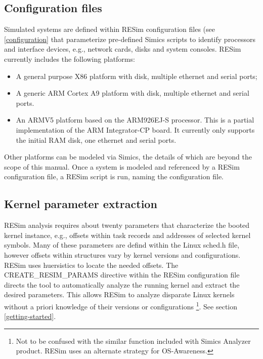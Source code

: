 \documentclass[titlepage]{article}
\begin{document}
\subsection{Configuration files}
Simulated systems are defined within RESim configuration files (see \ref{configuration} that  parameterize pre-defined Simics scripts to identify 
processors and interface devices, e.g., network cards, disks and system consoles.  RESim currently includes the following platforms: 
\begin{itemize}
\item A general purpose X86 platform with disk, multiple ethernet and serial ports;
\item A generic ARM Cortex A9 platform with disk, multiple ethernet and serial ports.
\item An ARMV5 platform based on the ARM926EJ-S processor.  This is a partial implementation of the ARM Integrator-CP board.  It currently only supports
the initial RAM disk, one ethernet and serial ports.
\end{itemize}

Other platforms can be modeled via Simics, the details of which are beyond the scope of this manual.
Once a system is modeled and referenced by a RESim configuration file, a RESim script is run, naming the configuration file.

\subsection{Kernel parameter extraction}
RESim analysis requires about twenty parameters that characterize the booted kernel instance, e.g., offsets within task 
records and addresses of selected kernel symbols. Many of these parameters are defind within the Linux sched.h file, however offsets within structures
vary by kernel versions and configurations.  RESim uses huersistics to locate the needed offsets. 
The CREATE\_RESIM\_PARAMS directive within the RESim configuration file directs the tool to automatically analyze the running kernel 
and extract the desired parameters.  This allows RESim to analyze disparate Linux kernels without a priori 
knowledge of their versions or configurations \footnote{Not to be confused with the similar function included with Simics Analyzer product. RESim uses an alternate strategy for OS-Awareness.}.
See section \ref{getting-started}.
\end{document}

